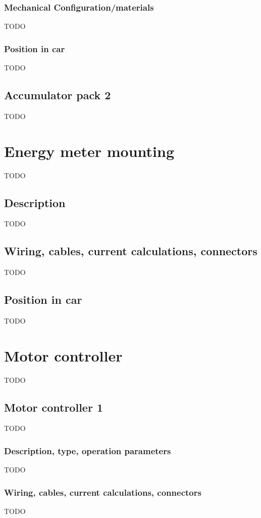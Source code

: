 \documentclass{article}
\begin{document}
\subsubsection{Mechanical Configuration/materials}
TODO

\subsubsection{Position in car}
TODO

\subsection{Accumulator pack 2}
TODO

\section{Energy meter mounting}
TODO

\subsection{Description}
TODO

\subsection{Wiring, cables, current calculations, connectors}
TODO

\subsection{Position in car}
TODO

\section{Motor controller}
TODO

\subsection{Motor controller 1}
TODO

\subsubsection{Description, type, operation parameters}
TODO

\subsubsection{Wiring, cables, current calculations, connectors}
TODO
\end{document}
